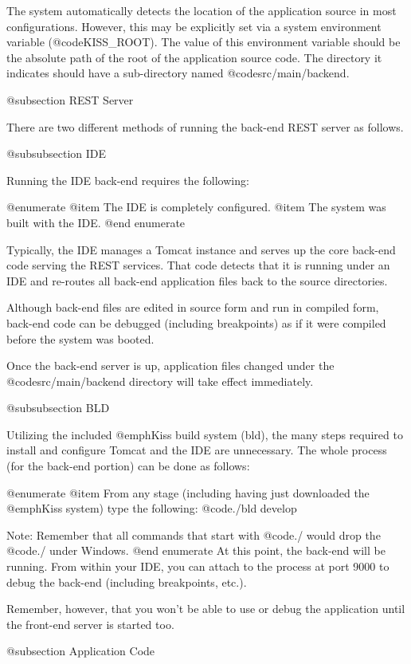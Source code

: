 The system automatically detects the location of the application
source in most configurations.  However, this may be explicitly
set via a system environment variable (@code{KISS_ROOT}).  The
value of this environment variable should be the absolute path of the
root of the application source code.  The directory it indicates
should have a sub-directory named @code{src/main/backend}.



@subsection REST Server

There are two different methods of running the back-end REST server as
follows.

@subsubsection IDE

Running the IDE back-end requires the following:

@enumerate
@item
The IDE is completely configured.
@item
The system was built with the IDE.
@end enumerate

Typically, the IDE manages a Tomcat instance and serves up the core
back-end code serving the REST services.  That code detects that it is
running under an IDE and re-routes all back-end application files back
to the source directories.

Although back-end files are edited in source form and run in compiled
form, back-end code can be debugged (including breakpoints) as if
it were compiled before the system was booted.

Once the back-end server is up, application files changed under the
@code{src/main/backend} directory will take effect immediately.

@subsubsection BLD

Utilizing the included @emph{Kiss build system (bld)}, the many steps required 
to install and configure Tomcat and the IDE are unnecessary.  The whole process
(for the back-end portion) can be done as follows:

@enumerate
@item
From any stage (including having just downloaded the @emph{Kiss} system) type
the following:  @code{./bld develop}

Note:  Remember that all commands that start with @code{./} would drop
the @code{./} under Windows.
@end enumerate
At this point, the back-end will be running.  From within your IDE, you
can attach to the process at port 9000 to debug the back-end (including
breakpoints, etc.).

Remember, however, that you won't be able to use or debug the application until
the front-end server is started too.

@subsection Application Code

